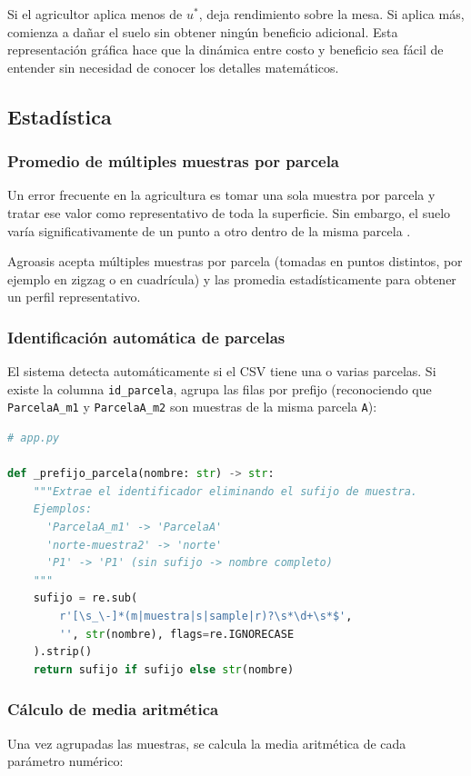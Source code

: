 \documentclass[12pt]{article}
\begin{document}
Si el agricultor aplica menos de $u^*$, deja rendimiento sobre la mesa. Si aplica más, comienza a dañar el suelo sin obtener ningún beneficio adicional. Esta representación gráfica hace que la dinámica entre costo y beneficio sea fácil de entender sin necesidad de conocer los detalles matemáticos.

\subsection{Estadística}
\subsubsection{Promedio de múltiples muestras por parcela}
Un error frecuente en la agricultura es tomar una sola muestra por parcela y tratar ese valor como representativo de toda la superficie. Sin embargo, el suelo varía significativamente de un punto a otro dentro de la misma parcela \citep{weil_brady_2017}.

Agroasis acepta múltiples muestras por parcela (tomadas en puntos distintos, por ejemplo en zigzag o en cuadrícula) y las promedia estadísticamente para obtener un perfil representativo.

\subsubsection{Identificación automática de parcelas}
El sistema detecta automáticamente si el CSV tiene una o varias parcelas. Si existe la columna \texttt{id\_parcela}, agrupa las filas por prefijo (reconociendo que \texttt{ParcelaA\_m1} y \texttt{ParcelaA\_m2} son muestras de la misma parcela \texttt{A}):
\begin{lstlisting}[language=Python]
# app.py

def _prefijo_parcela(nombre: str) -> str:
    """Extrae el identificador eliminando el sufijo de muestra.
    Ejemplos:
      'ParcelaA_m1' -> 'ParcelaA'
      'norte-muestra2' -> 'norte'
      'P1' -> 'P1' (sin sufijo -> nombre completo)
    """
    sufijo = re.sub(
        r'[\s_\-]*(m|muestra|s|sample|r)?\s*\d+\s*$',
        '', str(nombre), flags=re.IGNORECASE
    ).strip()
    return sufijo if sufijo else str(nombre)
\end{lstlisting}

\subsubsection{Cálculo de media aritmética}
Una vez agrupadas las muestras, se calcula la media aritmética de cada parámetro numérico:
\end{document}
